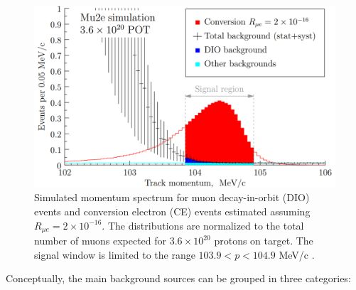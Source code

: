 \documentclass[12pt,a4paper,openright, oneside, titlepage]{book} %
\begin{document}
\begin{figure}[h!]
\centering
\includegraphics[scale=0.6]{signal_bg}
\caption[Mu2e simulated signal]{Simulated momentum spectrum for muon decay-in-orbit (DIO) events and conversion electron (CE) events estimated assuming $R_{\mu e} = 2 \times 10 ^{-16}$. 
The distributions are normalized to the total number of muons expected for $3.6 \times 10^{20}$ protons on target. 
The signal window is limited to the range $103.9 < p < 104.9$ MeV/c \cite{Manolis} \cite{CD3}.}
\label{_signal_bg}
\end{figure}

\noindent Conceptually, the main background sources can be grouped in three categories: 
\end{document}
